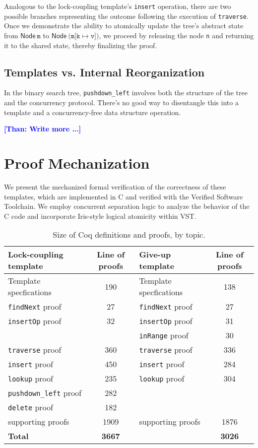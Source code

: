 \documentclass[a4paper,UKenglish,cleveref, autoref, thm-restate]{lipics-v2021}
\newcommand{\treerep}{\ensuremath{\mathsf{Node}}}
\newcommand{\than}[1]{\textbf{\textcolor{blue}{[Than: #1]}}}
\begin{document}
Analogous to the lock-coupling template's \texttt{insert} operation, there are two possible branches representing the outcome following the execution of \texttt{traverse}. Once we demonstrate the ability to atomically update the tree's abstract state from $\treerep \ \texttt{m}$ to $\treerep\ (\texttt{m[k} \mapsto \texttt{v])}$, we proceed by releasing the node \texttt{n} and returning it to the shared state, thereby finalizing the proof.



\subsection{Templates vs. Internal Reorganization} %
In the binary search tree, \texttt{pushdown\_left} involves both the structure of the tree and the concurrency protocol. There's no good way to disentangle this into a template and a concurrency-free data structure operation.

\than{Write more ...}

\section{Proof Mechanization}
We present the mechanized formal verification of the correctness of these templates, which are implemented in C and verified with the Verified Software Toolchain. We employ concurrent separation logic to analyze the behavior of the C code and incorporate Iris-style logical atomicity within VST.

\begin{table}[h]
	\begin{center}
		\begin{tabular}{l | c || l | c } 
			\hline
			\textbf{Lock-coupling template} & \textbf{Line of proofs} & \textbf{Give-up  template} & \textbf{Line of proofs} \\
			\hline
			Template specfications & 190 & Template specfications & 138 \\
			\texttt{findNext} proof 	& 27  & \texttt{findNext} proof & 27 \\
			\texttt{insertOp} proof 	& 32  & \texttt{insertOp} proof & 31 \\
			& & \texttt{inRange} proof & 30 \\
			\texttt{traverse} proof	& 360  & \texttt{traverse} proof & 336 \\ 
			\texttt{insert} proof 	   		& 450  & \texttt{insert} proof & 284 \\
			\texttt{lookup} proof 	   	& 235  &  \texttt{lookup} proof & 304 \\ 
			\texttt{pushdown\_left} proof 	   	& 282 & & \\	
			\texttt{delete} proof 		& 182	 &   & 	 \\
			supporting proofs    & 	1909	 & supporting proofs 	& 1876 \\
			\hline
			\textbf{Total} & \textbf{3667} & & \textbf{3026}  
		\end{tabular}
		\caption{Size of Coq definitions and proofs, by topic.}
		\label{table_coq}
	\end{center}
\end{table}
\end{document}
